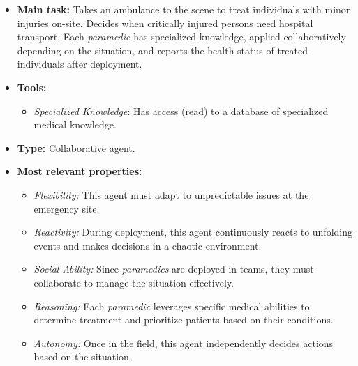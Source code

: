 \begin{itemize}
    \item \textbf{Main task:} Takes an ambulance to the scene to treat individuals with minor injuries on-site. Decides when critically injured persons need hospital transport. Each \textit{paramedic} has specialized knowledge, applied collaboratively depending on the situation, and reports the health status of treated individuals after deployment.
    \item \textbf{Tools:}
    \begin{itemize}
        \item \textit{Specialized Knowledge}: Has access (read) to a database of specialized medical knowledge.
    \end{itemize}
    \item \textbf{Type:} Collaborative agent.
    \item \textbf{Most relevant properties:}
    \begin{itemize}
        \item \textit{Flexibility:} This agent must adapt to unpredictable issues at the emergency site.
        \item \textit{Reactivity:} During deployment, this agent continuously reacts to unfolding events and makes decisions in a chaotic environment.
        \item \textit{Social Ability:} Since \textit{paramedics} are deployed in teams, they must collaborate to manage the situation effectively.
        \item \textit{Reasoning:} Each \textit{paramedic} leverages specific medical abilities to determine treatment and prioritize patients based on their conditions.
        \item \textit{Autonomy:} Once in the field, this agent independently decides actions based on the situation.
    \end{itemize}
\end{itemize}
